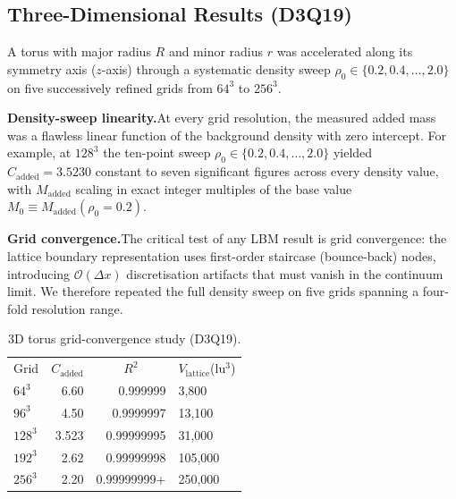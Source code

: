 \documentclass[reprint,amsmath,amssymb,aps,pre,floatfix]{revtex4-2}
\begin{document}
\subsection{Three-Dimensional Results (D3Q19)}
\label{sec:3d}

A torus with major radius $R$ and minor radius $r$ was accelerated along
its symmetry axis ($z$-axis) through a systematic density sweep
$\rho_0\in\{0.2,0.4,\ldots,2.0\}$ on five successively refined grids
from $64^{3}$ to $256^{3}$.

\textbf{Density-sweep linearity.}\quad At every grid resolution, the
measured added mass was a flawless linear function of the background
density with zero intercept.  For example, at $128^{3}$ the ten-point
sweep $\rho_0\in\{0.2,0.4,\ldots,2.0\}$ yielded
$C_{\mathrm{added}}=3.5230$ constant to seven significant figures across
every density value, with $M_{\mathrm{added}}$ scaling in exact integer
multiples of the base value $M_0\equiv M_{\mathrm{added}}(\rho_0{=}0.2)$.

\textbf{Grid convergence.}\quad The critical test of any LBM result is
grid convergence: the lattice boundary representation uses first-order
staircase (bounce-back) nodes, introducing $\mathcal{O}(\Delta x)$
discretisation artifacts that must vanish in the continuum limit.  We
therefore repeated the full density sweep on five grids spanning a
four-fold resolution range.

\begin{table}[H]
\caption{\label{tab:3d_conv}%
3D torus grid-convergence study (D3Q19).}
\begin{ruledtabular}
\begin{tabular}{lddl}
\textrm{Grid}
  & 
  & 
  & \textrm{$V_{\mathrm{lattice}}$\;(lu$^{3}$)} \\
\colrule
$64^{3}$   & 6.60  & 0.999999\phantom{00}  & 3{,}800  \\
$96^{3}$   & 4.50  & 0.9999997\phantom{0}  & 13{,}100 \\
$128^{3}$  & 3.523 & 0.99999995             & 31{,}000 \\
$192^{3}$  & 2.62  & 0.99999998             & 105{,}000 \\
$256^{3}$  & 2.20  & 0.99999999{+}          & 250{,}000 \\
\end{tabular}
\end{ruledtabular}
\end{table}
\end{document}
